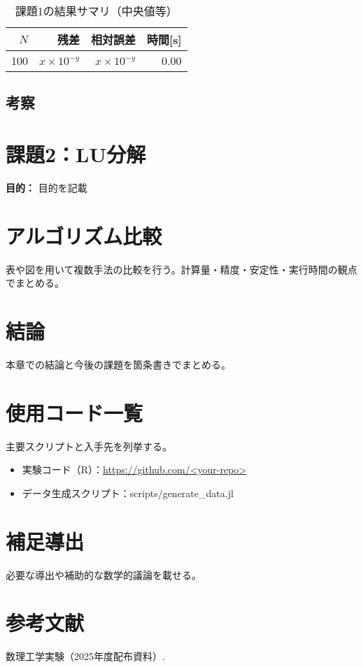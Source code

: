 \documentclass[a4paper,11pt]{ltjsarticle}
\newcommand{\ExperimentHeader}[2]{%
  \section{#1}%
  \textbf{目的：} #2\par\vspace{6pt}%
}
\begin{document}
\begin{table}[H]
\centering
\caption{課題1の結果サマリ（中央値等）}
\begin{tabular}{r|r r r}
\toprule
$N$ & 残差 & 相対誤差 & 時間[s] \\
\midrule
100 & $x\times10^{-y}$ & $x\times10^{-y}$ & 0.00 \\
\bottomrule
\end{tabular}
\end{table}

\subsection{考察}

\ExperimentHeader{課題2：LU分解}{目的を記載}

\section{アルゴリズム比較}
表や図を用いて複数手法の比較を行う。計算量・精度・安定性・実行時間の観点でまとめる。

\section{結論}
本章での結論と今後の課題を箇条書きでまとめる。

\appendix
\section{使用コード一覧}
主要スクリプトと入手先を列挙する。
\begin{itemize}
  \item 実験コード（R）：\url{https://github.com/<your-repo>}
  \item データ生成スクリプト：scripts/generate_data.jl
\end{itemize}

\section{補足導出}
必要な導出や補助的な数学的議論を載せる。

\section*{参考文献}
\begin{thebibliography}{9}
 数理工学実験（2025年度配布資料）.
\end{thebibliography}
\end{document}
